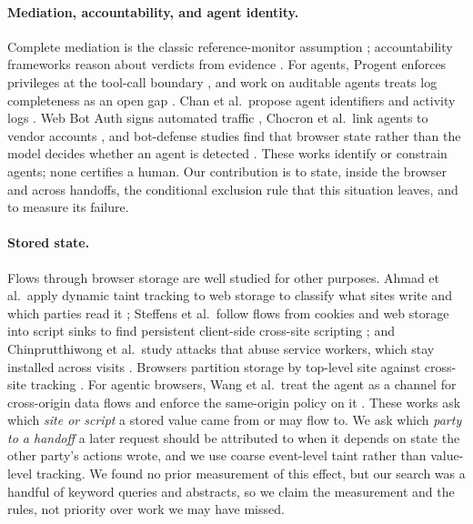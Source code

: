 \documentclass[11pt]{article}
\theoremstyle{definition}
\begin{document}
\paragraph{Mediation, accountability, and agent identity.} Complete mediation is
the classic reference-monitor assumption \cite{saltzer1975}; accountability
frameworks reason about verdicts from evidence \cite{kusters2010}. For agents,
Progent enforces privileges at the tool-call boundary \cite{progent}, and work on
auditable agents treats log completeness as an open gap \cite{nian2026auditable}.
Chan et al.\ propose agent identifiers and activity logs \cite{chan2024visibility}.
Web Bot Auth signs automated traffic \cite{webbotauth}, Chocron et al.\ link agents
to vendor accounts \cite{chocron2026}, and bot-defense studies find that browser
state rather than the model decides whether an agent is detected
\cite{ousat2026broken}. These works identify or constrain agents; none certifies a
human. Our contribution is to state, inside the browser and across handoffs, the
conditional exclusion rule that this situation leaves, and to measure its failure.

\paragraph{Stored state.} Flows through browser storage are well studied for other
purposes. Ahmad et al.\ apply dynamic taint tracking to web storage to classify
what sites write and which parties read it \cite{ahmad2023webstorage}; Steffens
et al.\ follow flows from cookies and web storage into script sinks to find
persistent client-side cross-site scripting \cite{steffens2019locals}; and
Chinprutthiwong et al.\ study attacks that abuse service workers, which stay
installed across visits \cite{chinprutthiwong2021sw}. Browsers partition storage
by top-level site against cross-site tracking \cite{storagepartitioning}. For
agentic browsers, Wang et al.\ treat the agent as a channel for cross-origin data
flows and enforce the same-origin policy on it \cite{wang2026sop}. These works ask
which \emph{site or script} a stored value came from or may flow to. We ask which
\emph{party to a handoff} a later request should be attributed to when it depends
on state the other party's actions wrote, and we use coarse event-level taint
rather than value-level tracking. We found no prior measurement of this effect,
but our search was a handful of keyword queries and abstracts, so we claim the
measurement and the rules, not priority over work we may have missed.
\end{document}
